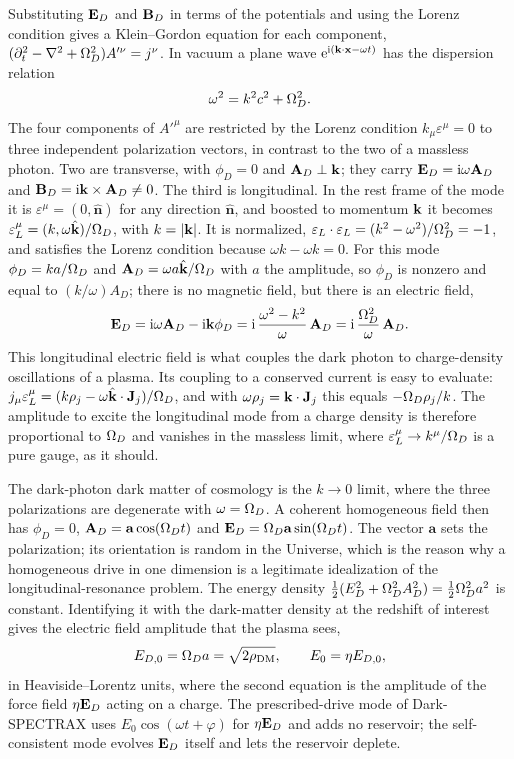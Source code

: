 Substituting $\mathbf E_D$ and $\mathbf B_D$ in terms of the potentials and using the Lorenz condition gives a Klein--Gordon equation for each component, $(\partial_t^2-\nabla^2+\Omega_D^2)A'^\nu=j^\nu$. In vacuum a plane wave $\mathrm{e}^{\mathrm{i}(\mathbf k\cdot\mathbf x-\omega t)}$ has the dispersion relation
\begin{equation}
\omega^2=k^2c^2+\Omega_D^2 .\label{eq:dispD}
\end{equation}
The four components of $A'^\mu$ are restricted by the Lorenz condition $k_\mu\varepsilon^\mu=0$ to three independent polarization vectors, in contrast to the two of a massless photon. Two are transverse, with $\phi_D=0$ and $\mathbf A_D\perp\mathbf k$; they carry $\mathbf E_D=\mathrm{i}\omega\mathbf A_D$ and $\mathbf B_D=\mathrm{i}\mathbf k\times\mathbf A_D\neq0$. The third is longitudinal. In the rest frame of the mode it is $\varepsilon^\mu=(0,\hat{\mathbf n})$ for any direction $\hat{\mathbf n}$, and boosted to momentum $\mathbf k$ it becomes $\varepsilon_L^\mu=(k,\omega\hat{\mathbf k})/\Omega_D$, with $k=|\mathbf k|$. It is normalized, $\varepsilon_L\cdot\varepsilon_L=(k^2-\omega^2)/\Omega_D^2=-1$, and satisfies the Lorenz condition because $\omega k-\omega k=0$. For this mode $\phi_D=ka/\Omega_D$ and $\mathbf A_D=\omega a\hat{\mathbf k}/\Omega_D$ with $a$ the amplitude, so $\phi_D$ is nonzero and equal to $(k/\omega)A_{D}$; there is no magnetic field, but there is an electric field,
\begin{equation}
\mathbf E_D=\mathrm{i}\omega\mathbf A_D-\mathrm{i}\mathbf k\phi_D=\mathrm{i}\,\frac{\omega^2-k^2}{\omega}\,\mathbf A_D=\mathrm{i}\,\frac{\Omega_D^2}{\omega}\,\mathbf A_D .\label{eq:ELong}
\end{equation}
This longitudinal electric field is what couples the dark photon to charge-density oscillations of a plasma. Its coupling to a conserved current is easy to evaluate: $j_\mu\varepsilon_L^\mu=(k\rho_j-\omega\hat{\mathbf k}\cdot\mathbf J_j)/\Omega_D$, and with $\omega\rho_j=\mathbf k\cdot\mathbf J_j$ this equals $-\Omega_D\rho_j/k$. The amplitude to excite the longitudinal mode from a charge density is therefore proportional to $\Omega_D$ and vanishes in the massless limit, where $\varepsilon_L^\mu\to k^\mu/\Omega_D$ is a pure gauge, as it should.

The dark-photon dark matter of cosmology is the $k\to0$ limit, where the three polarizations are degenerate with $\omega=\Omega_D$. A coherent homogeneous field then has $\phi_D=0$, $\mathbf A_D=\mathbf a\cos(\Omega_D t)$ and $\mathbf E_D=\Omega_D\mathbf a\sin(\Omega_D t)$. The vector $\mathbf a$ sets the polarization; its orientation is random in the Universe, which is the reason why a homogeneous drive in one dimension is a legitimate idealization of the longitudinal-resonance problem. The energy density $\tfrac12(E_D^2+\Omega_D^2A_D^2)=\tfrac12\Omega_D^2a^2$ is constant. Identifying it with the dark-matter density at the redshift of interest gives the electric field amplitude that the plasma sees,
\begin{equation}
E_{D,0}=\Omega_D a=\sqrt{2\rho_{\rm DM}} ,\qquad E_0=\eta E_{D,0},\label{eq:E0}
\end{equation}
in Heaviside--Lorentz units, where the second equation is the amplitude of the force field $\eta\mathbf E_D$ acting on a charge. The prescribed-drive mode of Dark-SPECTRAX uses $E_0\cos(\omega t+\varphi)$ for $\eta\mathbf E_D$ and adds no reservoir; the self-consistent mode evolves $\mathbf E_D$ itself and lets the reservoir deplete.

